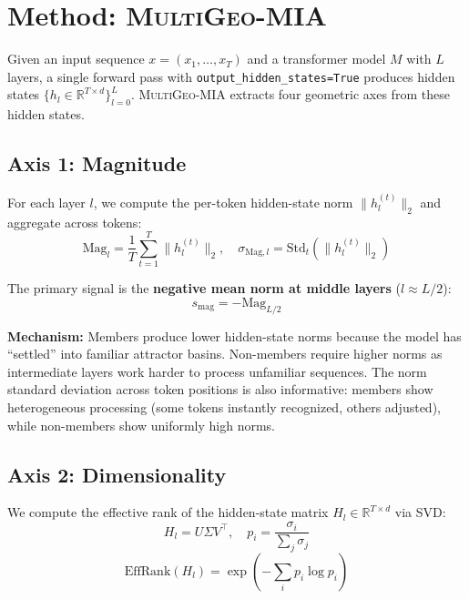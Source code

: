 \documentclass[11pt]{article}
\newcommand{\ours}{\textsc{MultiGeo-MIA}}
\begin{document}
\section{Method: \ours{}}
\label{sec:method}

Given an input sequence $x = (x_1, \ldots, x_T)$ and a transformer model $M$ with $L$ layers, a single forward pass with \texttt{output\_hidden\_states=True} produces hidden states $\{h_l \in \mathbb{R}^{T \times d}\}_{l=0}^{L}$.
\ours{} extracts four geometric axes from these hidden states.

\subsection{Axis 1: Magnitude}
\label{sec:magnitude}

For each layer $l$, we compute the per-token hidden-state norm $\|h_l^{(t)}\|_2$ and aggregate across tokens:
\begin{equation}
    \text{Mag}_l = \frac{1}{T} \sum_{t=1}^T \|h_l^{(t)}\|_2, \quad
    \sigma_{\text{Mag},l} = \text{Std}_t(\|h_l^{(t)}\|_2)
\end{equation}

The primary signal is the \textbf{negative mean norm at middle layers} ($l \approx L/2$):
\begin{equation}
    s_{\text{mag}} = -\text{Mag}_{L/2}
\end{equation}

\textbf{Mechanism:} Members produce lower hidden-state norms because the model has ``settled'' into familiar attractor basins.
Non-members require higher norms as intermediate layers work harder to process unfamiliar sequences.
The norm standard deviation across token positions is also informative: members show heterogeneous processing (some tokens instantly recognized, others adjusted), while non-members show uniformly high norms.

\subsection{Axis 2: Dimensionality}
\label{sec:dimensionality}

We compute the effective rank \citep{roy2007effective} of the hidden-state matrix $H_l \in \mathbb{R}^{T \times d}$ via SVD:
\begin{equation}
    H_l = U \Sigma V^\top, \quad p_i = \frac{\sigma_i}{\sum_j \sigma_j}
\end{equation}
\begin{equation}
    \text{EffRank}(H_l) = \exp\left(-\sum_i p_i \log p_i\right)
\end{equation}
\end{document}
